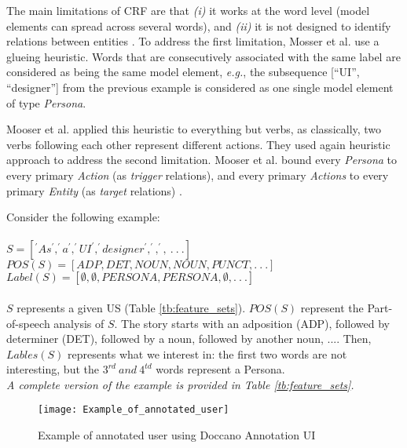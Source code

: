 The main limitations of CRF are that \emph{(i)} it works at the word level (model elements can spread across several words), and \emph{(ii)} it is not designed to identify relations between entities \cite{arulmohan2023extracting}.
    To address the first limitation, Mosser et al. use a glueing heuristic. Words that are consecutively associated with the same label are considered as being the same model element, \emph{e.g.}, the subsequence [\enquote{UI}, \enquote{designer}] from the previous example is considered as one single model element of type \emph{Persona}.
    
Mooser et al. applied this heuristic to everything but verbs, as classically, two verbs following each other represent different actions. They used again heuristic approach to address the second limitation. Mooser et al. bound every \emph{Persona} to every primary \emph{Action} (as\emph{ trigger} relations), and every primary \emph{Actions} to every primary \emph{Entity} (as \emph{target} relations) \cite{arulmohan2023extracting}.
\begin{example} Consider the following example:\\ \\
$S=[^\prime As^\prime,^\prime a^\prime,^\prime UI^\prime,^\prime designer^\prime,^\prime,^\prime,\ .\ .\ .]$ \\
$POS(S)=[ADP,DET,NOUN,NOUN,PUNCT,.\ .\ .]$ \\
$Label \left (S \right ) = \left [ \emptyset ,\emptyset ,PERSONA,PERSONA,\emptyset ,.\ .\ .\right ]$ \\\\
$S$ represents a given US (Table \ref{tb:feature_sets}). $POS \left (S \right )$ represent the Part-of-speech analysis of $S$. The story starts with an adposition (ADP), followed by determiner (DET), followed by a noun, followed by another noun, .... Then, $Lables\left (S \right )$ represents what we interest in: the first two words are not interesting, but the $3^{rd}\  and \ 4^{td}$ words represent a Persona.\\ 
\emph{A complete version of the example is provided in Table \ref{tb:feature_sets}.}
\end{example}
\begin{figure}[h]
\center
\texttt{[image: Example\_of\_annotated\_user]}
\caption{Example of annotated user using Doccano Annotation UI \cite{arulmohan2023extracting}}\label{fig:annot_usr}
\end{figure}
